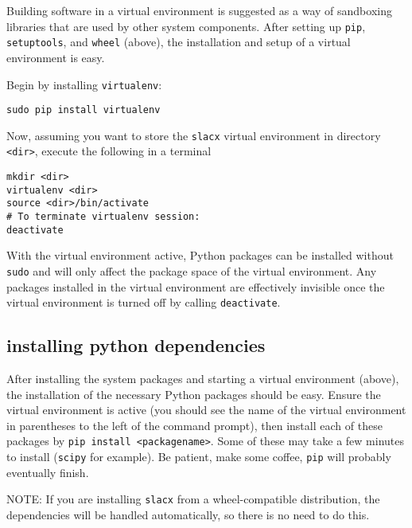 Building software in a virtual environment is suggested 
as a way of sandboxing libraries that are used by other system components.
After setting up \verb|pip|, \verb|setuptools|, and \verb|wheel| (above),
the installation and setup of a virtual environment is easy.

Begin by installing \verb|virtualenv|:
\begin{lstlisting}
sudo pip install virtualenv
\end{lstlisting}

Now, assuming you want to store the \verb|slacx| virtual environment
in directory \verb|<dir>|,
execute the following in a terminal
\begin{lstlisting}
mkdir <dir> 
virtualenv <dir>
source <dir>/bin/activate
# To terminate virtualenv session:
deactivate
\end{lstlisting}

With the virtual environment active,
Python packages can be installed without \verb|sudo|
and will only affect the package space of the virtual environment.
Any packages installed in the virtual environment are effectively invisible
once the virtual environment is turned off by calling \verb|deactivate|.


\subsection{installing python dependencies}
\label{subsec:dependencies}

After installing the system packages and starting a virtual environment (above),
the installation of the necessary Python packages should be easy.
Ensure the virtual environment is active
(you should see the name of the virtual environment 
in parentheses to the left of the command prompt),
then install each of these packages by \verb|pip install <packagename>|.
Some of these may take a few minutes to install (\verb|scipy| for example).
Be patient, make some coffee, \verb|pip| will probably eventually finish.

NOTE: If you are installing \verb|slacx| 
from a wheel-compatible distribution, 
the dependencies will be handled automatically,
so there is no need to do this.

